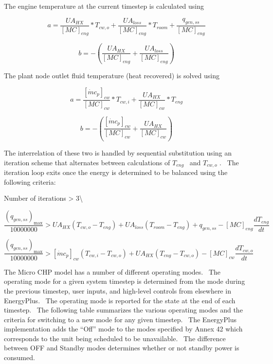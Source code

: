 The engine temperature at the current timestep is calculated using

\begin{equation}
a = \frac{{U{A_{HX}}}}{{{{[MC]}_{eng}}}}*{T_{cw,o}} + \frac{{U{A_{loss}}}}{{{{[MC]}_{eng}}}}*{T_{room}} + \frac{{{q_{gen,ss}}}}{{{{[MC]}_{eng}}}}
\end{equation}

\begin{equation}
b =  - \left( {\frac{{U{A_{HX}}}}{{{{[MC]}_{eng}}}} + \frac{{U{A_{loss}}}}{{{{[MC]}_{eng}}}}} \right)
\end{equation}

The plant node outlet fluid temperature (heat recovered) is solved using

\begin{equation}
a = \frac{{{{[\dot m{c_p}]}_{cw}}}}{{{{[MC]}_{cw}}}}*{T_{cw,i}} + \frac{{U{A_{HX}}}}{{{{[MC]}_{cw}}}}*{T_{eng}}
\end{equation}

\begin{equation}
b =  - \left( {\frac{{{{[\dot m{c_p}]}_{cw}}}}{{{{[MC]}_{cw}}}} + \frac{{U{A_{HX}}}}{{{{[MC]}_{cw}}}}} \right)
\end{equation}

The interrelation of these two is handled by sequential substitution using an iteration scheme that alternates between calculations of \({T_{eng}}\) ~and \({T_{cw,o}}\) .~ The iteration loop exits once the energy is determined to be balanced using the following criteria:

Number of iterations \textgreater{} 3\textbackslash{}

\begin{equation}
\frac{{{{\left( {{q_{gen,ss}}} \right)}_{\max }}}}{{10000000}} > U{A_{HX}}\left( {{T_{cw,o}} - {T_{eng}}} \right) + U{A_{loss}}\left( {{T_{room}} - {T_{eng}}} \right) + {q_{gen,ss}} - {[MC]_{eng}}\frac{{d{T_{eng}}}}{{dt}}
\end{equation}

\begin{equation}
\frac{{{{\left( {{q_{gen,ss}}} \right)}_{\max }}}}{{10000000}} > {[\dot m{c_p}]_{cw}}\left( {{T_{cw,i}} - {T_{cw,o}}} \right) + U{A_{HX}}\left( {{T_{eng}} - {T_{cw,o}}} \right) - {[MC]_{cw}}\frac{{d{T_{cw,o}}}}{{dt}}
\end{equation}

The Micro CHP model has a number of different operating modes.~ The operating mode for a given system timestep is determined from the mode during the previous timestep, user inputs, and high-level controls from elsewhere in EnergyPlus.~ The operating mode is reported for the state at the end of each timestep.~ The following table summarizes the various operating modes and the criteria for switching to a new mode for any given timestep.~ The EnergyPlus implementation adds the ``Off'' mode to the modes specified by Annex 42 which corresponds to the unit being scheduled to be unavailable.~ The difference between OFF and Standby modes determines whether or not standby power is consumed.

